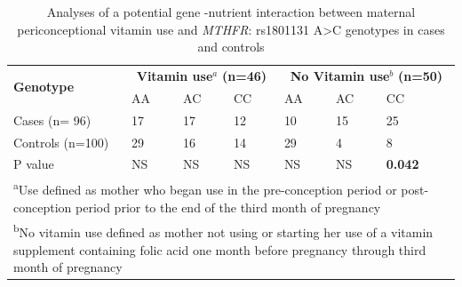 \begin{refsection}
\begin{table}[tb]
\centering
\caption[Analyses of a potential gene -nutrient interaction]{Analyses of a potential gene -nutrient interaction between maternal periconceptional vitamin use and \textit{MTHFR}: rs1801131 A>C genotypes in cases and controls}
\label{tab:6_10}
\begin{tabular}{ p{1.5in} p{0.5in} p{0.5in} p{0.5in} p{0.5in} p{0.5in} p{0.5in} }
\toprule
	 \multirow{2}{*}{\textbf{Genotype}} & \multicolumn{3}{c}{\textbf{Vitamin use$^a$}  %
	 \textbf{(n=46)}} & \multicolumn{3}{c}{\textbf{No Vitamin use$^b$}
	 \textbf{(n=50)}} \\ 
	 & AA & AC & CC & AA & AC & CC \\ \toprule
	Cases (n= 96) & 17 & 17 & 12 & 10 & 15 & 25 \\ \midrule
	Controls (n=100) & 29 & 16 & 14 & 29 & 4 & 8 \\ \midrule
	P value & NS & NS & NS & NS & NS & \textbf{0.042} \\ \bottomrule 


\multicolumn{7}{l}{\begin{minipage}{5.5in} \vspace{6pt}
\small \textsuperscript{a}Use defined as mother who began use in the pre-conception period or post-conception period prior to the end of the third month of pregnancy
\end{minipage}} \\


\multicolumn{7}{l}{\begin{minipage}{5.5in} \vspace{6pt}
\small \textsuperscript{b}No vitamin use defined as mother not using or starting her use of a vitamin supplement containing folic acid one month before pregnancy through third month of pregnancy
\end{minipage}}


\end{tabular}
\end{table}
\end{refsection}
